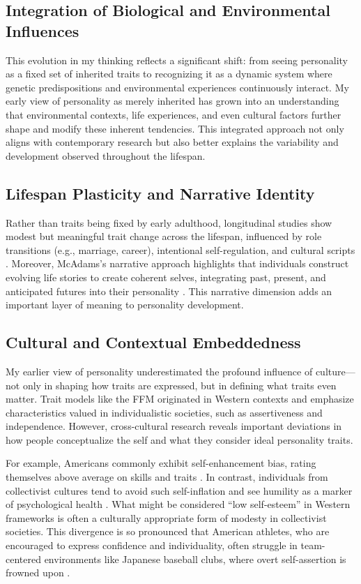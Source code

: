 \documentclass[stu]{apa7}
\begin{document}
\subsection{Integration of Biological and Environmental Influences}

This evolution in my thinking reflects a significant shift: from seeing personality as a fixed set of inherited traits to recognizing it as a dynamic system where genetic predispositions and environmental experiences continuously interact. My early view of personality as merely inherited has grown into an understanding that environmental contexts, life experiences, and even cultural factors further shape and modify these inherent tendencies. This integrated approach not only aligns with contemporary research but also better explains the variability and development observed throughout the lifespan.

\subsection{Lifespan Plasticity and Narrative Identity}

Rather than traits being fixed by early adulthood, longitudinal studies show modest but meaningful trait change across the lifespan, influenced by role transitions (e.g., marriage, career), intentional self-regulation, and cultural scripts \parencite{roberts2006patterns}. Moreover, McAdams's narrative approach highlights that individuals construct evolving life stories to create coherent selves, integrating past, present, and anticipated futures into their personality \parencite{mcadams2001bad}. This narrative dimension adds an important layer of meaning to personality development.

\subsection{Cultural and Contextual Embeddedness}

My earlier view of personality underestimated the profound influence of culture—not only in shaping how traits are expressed, but in defining what traits even matter. Trait models like the FFM originated in Western contexts and emphasize characteristics valued in individualistic societies, such as assertiveness and independence. However, cross-cultural research reveals important deviations in how people conceptualize the self and what they consider ideal personality traits.

For example, Americans commonly exhibit self-enhancement bias, rating themselves above average on skills and traits \parencite{taylor1989positive}. In contrast, individuals from collectivist cultures tend to avoid such self-inflation and see humility as a marker of psychological health \parencite{heine2007self}. What might be considered “low self-esteem” in Western frameworks is often a culturally appropriate form of modesty in collectivist societies. This divergence is so pronounced that American athletes, who are encouraged to express confidence and individuality, often struggle in team-centered environments like Japanese baseball clubs, where overt self-assertion is frowned upon \parencite{whiting1989you}.
\end{document}
